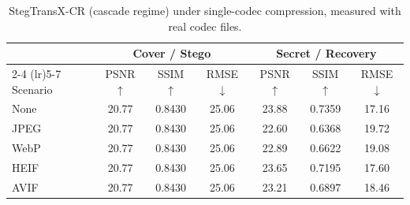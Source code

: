 \begin{table}[t]
\centering
\caption{StegTransX-CR (cascade regime) under single-codec compression, measured with real codec files.}
\label{tab:cascade-single-real}
\begin{tabular}{lcccccc}
\toprule
& \multicolumn{3}{c}{Cover / Stego} & \multicolumn{3}{c}{Secret / Recovery} \\
\cmidrule(lr){2-4} \cmidrule(lr){5-7}
Scenario & PSNR $\uparrow$ & SSIM $\uparrow$ & RMSE $\downarrow$ & PSNR $\uparrow$ & SSIM $\uparrow$ & RMSE $\downarrow$ \\
\midrule
None & 20.77 & 0.8430 & 25.06 & 23.88 & 0.7359 & 17.16 \\
JPEG & 20.77 & 0.8430 & 25.06 & 22.60 & 0.6368 & 19.72 \\
WebP & 20.77 & 0.8430 & 25.06 & 22.89 & 0.6622 & 19.08 \\
HEIF & 20.77 & 0.8430 & 25.06 & 23.65 & 0.7195 & 17.60 \\
AVIF & 20.77 & 0.8430 & 25.06 & 23.21 & 0.6897 & 18.46 \\
\bottomrule
\end{tabular}
\end{table}
